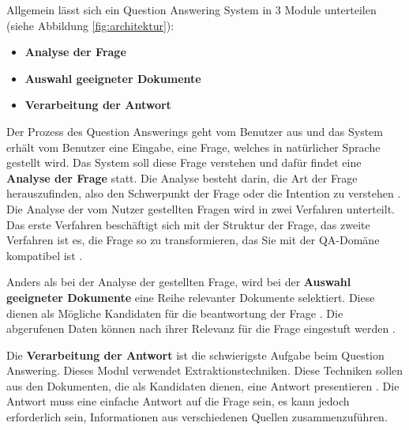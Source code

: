 \documentclass[
        ngerman,
        paper=a4,
        numbers=noendperiod,
]{scrreprt}
\begin{document}
%

Allgemein lässt sich ein Question Answering System in 3 Module unterteilen (siehe Abbildung \ref{fig:architektur}):
\begin{itemize}
    \item \textbf{Analyse der Frage}
    \item \textbf{Auswahl geeigneter Dokumente}
    \item \textbf{Verarbeitung der Antwort} 
\end{itemize}

Der Prozess des Question Answerings geht vom Benutzer aus und das System erhält vom Benutzer eine Eingabe, eine Frage, welches in natürlicher Sprache gestellt wird. Das System soll diese Frage verstehen und dafür findet eine \textbf{Analyse der Frage} statt. Die Analyse besteht darin, die Art der Frage herauszufinden, also den Schwerpunkt der Frage oder die Intention zu verstehen \citep{Malik2013DomainSystem}. Die Analyse der vom Nutzer gestellten Fragen wird in zwei Verfahren unterteilt. Das erste Verfahren beschäftigt sich mit der Struktur der Frage, das zweite Verfahren ist es, die Frage so zu transformieren, das Sie mit der QA-Domäne kompatibel ist \citep{Hamed2016AClassification}.

Anders als bei der Analyse der gestellten Frage, wird bei der \textbf{Auswahl geeigneter Dokumente} eine Reihe relevanter Dokumente selektiert. Diese dienen als Mögliche Kandidaten für die beantwortung der Frage \cite{Malik2013DomainSystem}. Die abgerufenen Daten können nach ihrer Relevanz für die Frage eingestuft werden \citep{Neves2015QuestionBiology}. 

Die \textbf{Verarbeitung der Antwort} ist die schwierigste Aufgabe beim Question Answering. Dieses Modul verwendet Extraktionstechniken. Diese Techniken sollen aus den Dokumenten, die als Kandidaten dienen, eine Antwort presentieren \citep{Bhoir2014QuestionApproach}. Die Antwort muss eine einfache Antwort auf die Frage sein, es kann jedoch erforderlich sein, Informationen aus verschiedenen Quellen zusammenzuführen.
\end{document}
